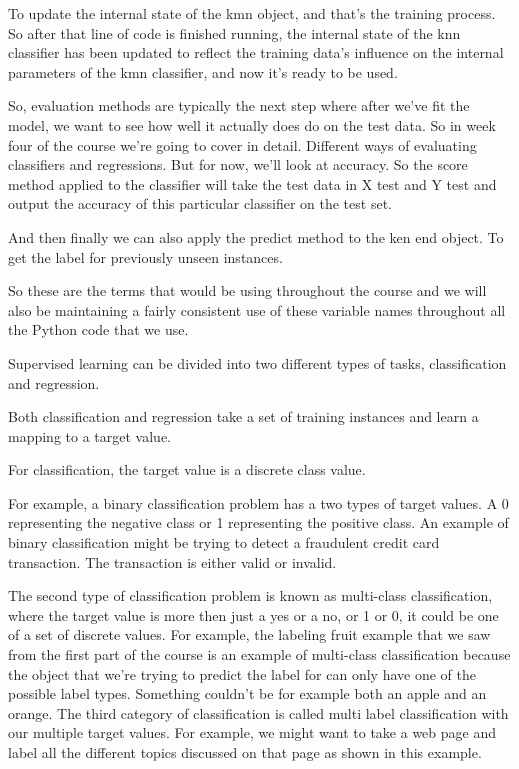 \begin{multicols}{2}
To update the internal state of the kmn object, and that's the training process. So after that line of code is finished running, the internal state of the knn classifier has been updated to reflect the training data's influence on the internal parameters of the kmn classifier, and now it's ready to be used. 

So, evaluation methods are typically the next step where after we've fit the model, we want to see how well it actually does do on the test data. So in week four of the course we're going to cover in detail. Different ways of evaluating classifiers and regressions. But for now, we'll look at accuracy. So the score method applied to the classifier will take the test data in X test and Y test and output the accuracy of this particular classifier on the test set. 

And then finally we can also apply the predict method to the ken end object. To get the label for previously unseen instances. 

So these are the terms that would be using throughout the course and we will also be maintaining a fairly consistent use of these variable names throughout all the Python code that we use. 

Supervised learning can be divided into two different types of tasks, classification and regression. 

Both classification and regression take a set of training instances and learn a mapping to a target value. 

For classification, the target value is a discrete class value. 

For example, a binary classification problem has a two types of target values. A 0 representing the negative class or 1 representing the positive class. An example of binary classification might be trying to detect a fraudulent credit card transaction. The transaction is either valid or invalid. 

The second type of classification problem is known as multi-class classification, where the target value is more then just a yes or a no, or 1 or 0, it could be one of a set of discrete values. For example, the labeling fruit example that we saw from the first part of the course is an example of multi-class classification because the object that we're trying to predict the label for can only have one of the possible label types. Something couldn't be for example both an apple and an orange. The third category of classification is called multi label classification with our multiple target values. For example, we might want to take a web page and label all the different topics discussed on that page as shown in this example. 


\end{multicols}
